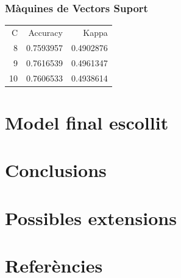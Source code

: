 \documentclass[a4paper]{article}
\begin{document}
\subsubsection{Màquines de Vectors Suport}

\begin{table}[H]
	\centering
	\def\arraystretch{1.2}
	\begin{tabular}{|rrr|}
		\hline
		C & Accuracy & Kappa \\
		8 & 0.7593957 & 0.4902876 \\
		\rowcolor{Orange!40}
		9 & 0.7616539 & 0.4961347 \\
		10 & 0.7606533 & 0.4938614 \\
		\hline
	\end{tabular}
\end{table}

\section{Model final escollit}
\section{Conclusions}
\section{Possibles extensions}
\section{Referències}



\end{document}
